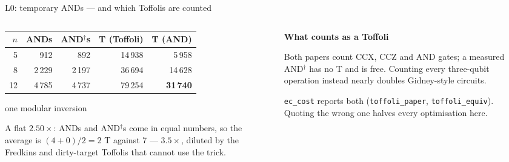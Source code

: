 \documentclass[aspectratio=169,11pt]{beamer}
\newcommand{\blocktitle}[1]{{\bfseries #1}\par\vskip1mm}
\begin{document}
\begin{frame}{L0: temporary ANDs --- and which Toffolis are counted}
  \begin{columns}[T]
    \begin{column}{0.52\textwidth}
      \centering\footnotesize
      \renewcommand{\arraystretch}{1.12}
      \begin{tabular}{@{}rrrrr@{}}
        \toprule
        $n$ & ANDs & AND$^\dagger$s & T (Toffoli) & T (AND) \\
        \midrule
        5 & 912 & 892 & 14\,938 & 5\,958 \\
        8 & 2\,229 & 2\,197 & 36\,694 & 14\,628 \\
        12 & 4\,785 & 4\,737 & 79\,254 & \textbf{31\,740} \\
        \bottomrule
      \end{tabular}\par
      {\scriptsize one modular inversion}\par
      \vskip2mm
      \raggedright\small
      A flat $2.50\times$: ANDs and AND$^\dagger$s come in equal numbers, so the average is $(4+0)/2=2$ T against 7 --- $3.5\times$, diluted by the Fredkins and dirty-target Toffolis that cannot use the trick.
    \end{column}
    \begin{column}{0.44\textwidth}
      \begin{greyblock}[fontupper=\small]
        \blocktitle{What counts as a Toffoli}
        Both papers count CCX, CCZ and AND gates; a measured AND$^\dagger$ has no T and is free. Counting every three-qubit operation instead nearly doubles Gidney-style circuits.\par\vskip1mm
        \texttt{ec\_cost} reports both (\texttt{toffoli\_paper}, \texttt{toffoli\_equiv}). Quoting the wrong one halves every optimisation here.
      \end{greyblock}
    \end{column}
  \end{columns}
\end{frame}
\end{document}
